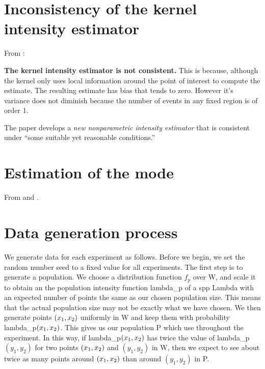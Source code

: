 \section{Inconsistency of the kernel intensity estimator}
\label{sec:theory:inconsistency}

From \citet{guan2008consistent}:

{
\color{red}
\textbf{The kernel intensity estimator is not consistent.}
This is because, although the kernel only uses local information around the point of interest to compute the estimate.
The resulting estimate has bias that tends to zero.
However it's variance does not diminish because the number of events in any fixed region is of order 1.
}

The paper develops a \textit{new nonparametric intensity estimator} that is consistent under ``some suitable yet reasonable conditions.''

\section{Estimation of the mode}
\label{sec:theory:mode}

From \citet{bickel2006fast} and \citet{hedges2003comparison}.


\section{Data generation process}
\label{sec:theory:data}

We generate data for each experiment as follows.
Before we begin, we set the random number seed to a fixed value for all experiments.
The first step is to generate a population.
We choose a distribution function $f_p$ over \gls{W}, and scale it to obtain an the population intensity function \gls{lambda_p} of a \gls{spp} \gls{Lambda} with an expected number of points the same as our chosen population size.
This means that the actual population size may not be exactly what we have chosen.
We then generate points $(x_1, x_2)$ uniformly in \gls{W} and keep them with probability \gls{lambda_p}$(x_1, x_2)$.
This gives us our population \gls{P} which use throughout the experiment.
In this way,
if \gls{lambda_p}$(x_1, x_2)$ has twice the value of \gls{lambda_p}$(y_1, y_2)$ for two points $(x_1, x_2)$ and $(y_1, y_2)$ in \gls{W},
then we expect to see about twice as many points around $(x_1, x_2)$ than around $(y_1, y_2)$ in \gls{P}.

